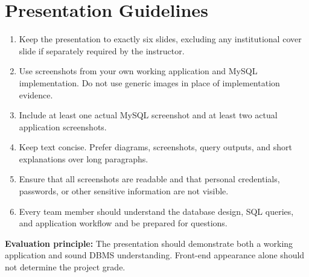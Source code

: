 \documentclass[12pt,a4paper]{article}
\begin{document}
\section*{Presentation Guidelines}
\begin{enumerate}
    \item Keep the presentation to exactly six slides, excluding any institutional cover slide if separately required by the instructor.
    \item Use screenshots from your own working application and MySQL implementation. Do not use generic images in place of implementation evidence.
    \item Include at least one actual MySQL screenshot and at least two actual application screenshots.
    \item Keep text concise. Prefer diagrams, screenshots, query outputs, and short explanations over long paragraphs.
    \item Ensure that all screenshots are readable and that personal credentials, passwords, or other sensitive information are not visible.
    \item Every team member should understand the database design, SQL queries, and application workflow and be prepared for questions.
\end{enumerate}


\noindent\textbf{Evaluation principle:} The presentation should demonstrate both a working application and sound DBMS understanding. Front-end appearance alone should not determine the project grade.
\end{document}
